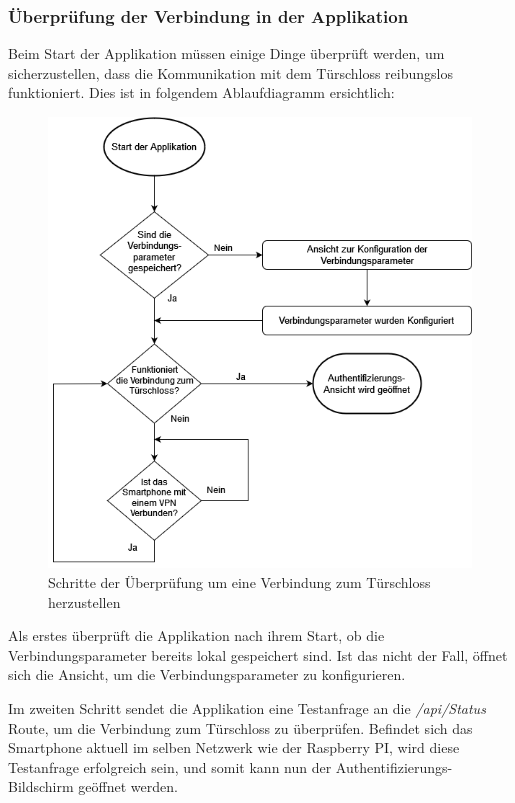 \subsubsection{Überprüfung der Verbindung in der Applikation}
Beim Start der Applikation müssen einige Dinge überprüft werden, um sicherzustellen, dass die Kommunikation mit 
dem Türschloss reibungslos funktioniert. Dies ist in folgendem Ablaufdiagramm ersichtlich:
\begin{figure}[H]
    \begin{center}
        \includegraphics[width=1\textwidth]{images/mobile/Startup.png}
        \caption{Schritte der Überprüfung um eine Verbindung zum Türschloss herzustellen}
    \end{center}
\end{figure}

Als erstes überprüft die Applikation nach ihrem Start, ob die Verbindungsparameter bereits lokal gespeichert sind.
Ist das nicht der Fall, öffnet sich die Ansicht, um die Verbindungsparameter zu konfigurieren.

Im zweiten Schritt sendet die Applikation eine Testanfrage an die \textit{/api/Status} Route, um die Verbindung 
zum Türschloss zu überprüfen.
Befindet sich das Smartphone aktuell im selben Netzwerk wie der Raspberry PI, wird diese Testanfrage erfolgreich sein, 
und somit kann nun der Authentifizierungs-Bildschirm geöffnet werden.

